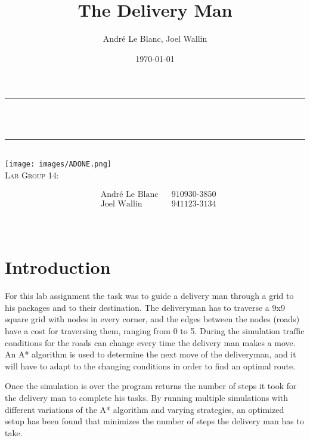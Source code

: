 \documentclass[12pt, a4paper]{article}
\title{The Delivery Man}	%
\author{André Le Blanc, Joel Wallin}
\date{\today}
\makeatletter
\let\thetitle\@title
\makeatother
\begin{document}
\begin{titlepage}
	\centering
    \vspace*{0.5 cm}
	\rule{\linewidth}{0.2 mm} \\[0.4 cm]
	{ \huge \bfseries \thetitle}\\  
	\rule{\linewidth}{0.2 mm} \\[1.5 cm]
    \texttt{[image: images/ADONE.png]}\\[0.5 cm]
    
    \textsc{\Large Lab Group 14:}\\[0.5 cm]
	\begin{minipage}{0.4\textwidth}  
    \begin{align*}
	&\text{André Le Blanc}    &&\text{910930-3850}\\
	&\text{Joel Wallin}  &&\text{941123-3134}\\
	\end{align*}
	\end{minipage}\\[2 cm]
\end{titlepage}


\newpage
\tableofcontents
\newpage

\section{Introduction}

For this lab assignment the task was to guide a delivery man through a grid to his packages and to their destination. The deliveryman has to traverse a 9x9 square grid with nodes in every corner, and the edges between the nodes (roads) have a cost for traversing them, ranging from 0 to 5. During the simulation traffic conditions for the roads can change every time the delivery man makes a move. An A* algorithm is used to determine the next move of the deliveryman, and it will have to adapt to the changing conditions in order to find an optimal route.

Once the simulation is over the program returns the number of steps it took for the delivery man to complete his tasks. By running multiple simulations with different variations of the A* algorithm and varying strategies, an optimized setup has been found that minimizes the number of steps the delivery
man has to take.
\end{document}

